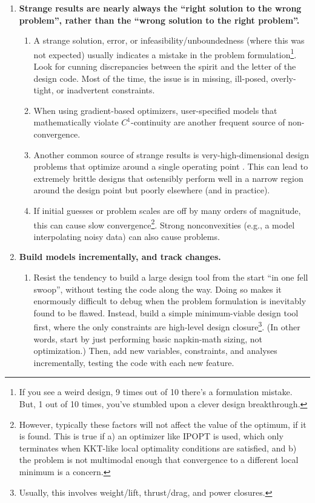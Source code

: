 \begin{enumerate}
\begin{enumerate}
    \end{enumerate}
    \item \textbf{Strange results are nearly always the ``right solution to the wrong problem'', rather than the ``wrong solution to the right problem''.}
    \begin{enumerate}
        \item A strange solution, error, or infeasibility/unboundedness (where this was not expected) usually indicates a mistake in the problem formulation\footnote{If you see a weird design, 9 times out of 10 there's a formulation mistake. But, 1 out of 10 times, you've stumbled upon a clever design breakthrough.}. Look for cunning discrepancies between the spirit and the letter of the design code. Most of the time, the issue is in missing, ill-posed, overly-tight, or inadvertent constraints.
        \item When using gradient-based optimizers, user-specified models that mathematically violate $C^1$-continuity are another frequent source of non-convergence.
        \item Another common source of strange results is very-high-dimensional design problems that optimize around a single operating point \cite{drela_pros_1998}. This can lead to extremely brittle designs that ostensibly perform well in a narrow region around the design point but poorly elsewhere (and in practice).
        \item If initial guesses or problem scales are off by many orders of magnitude, this can cause slow convergence\footnote{However, typically these factors will not affect the value of the optimum, if it is found. This is true if a) an optimizer like IPOPT is used, which only terminates when KKT-like local optimality conditions are satisfied, and b) the problem is not multimodal enough that convergence to a different local minimum is a concern.}. Strong nonconvexities (e.g., a model interpolating noisy data) can also cause problems.
    \end{enumerate}
    \item \textbf{Build models incrementally, and track changes.}
    \begin{enumerate}
        \item Resist the tendency to build a large design tool from the start ``in one fell swoop'', without testing the code along the way. Doing so makes it enormously difficult to debug when the problem formulation is inevitably found to be flawed. Instead, build a simple minimum-viable design tool first, where the only constraints are high-level design closure\footnote{Usually, this involves weight/lift, thrust/drag, and power closures.}. (In other words, start by just performing basic napkin-math sizing, not optimization.) Then, add new variables, constraints, and analyses incrementally, testing the code with each new feature.

\end{enumerate}
\end{enumerate}
